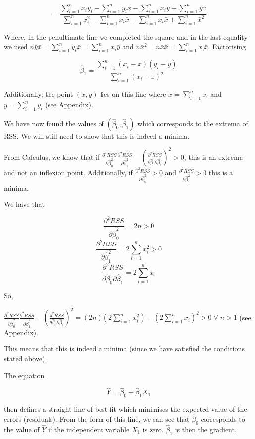 \documentclass[11pt]{article}
\begin{document}
\[= \frac{\sum_{i=1}^n x_i y_i - \sum_{i=1}^n y_i \bar{x} - \sum_{i=1}^n x_i \bar{y}  + \sum_{i=1}^n \bar{y} \bar{x}}{\sum_{i=1}^n x_i^2 - \sum_{i=1}^n x_i \bar{x} - \sum_{i=1}^n x_i \bar{x} + \sum_{i=1}^n \bar{x}^2}\]

Where, in the penultimate line we completed the square and in the last
equality we used
\(n\bar{y} \bar{x} = \sum_{i=1}^n y_i \bar{x} = \sum_{i=1}^n x_i \bar{y}\)
and \(n\bar{x}^2 = n\bar{x} \bar{x} = \sum_{i=1}^n x_i \bar{x}\).
Factorising

\[\hat{\beta}_1 = \frac{\sum_{i=1}^n (x_i - \bar{x})(y_i - \bar{y})}{\sum_{i=1}^n (x_i - \bar{x})^2}\]

Additionally, the point \((\bar{x},\bar{y})\) lies on this line where
\(\bar{x} = \sum_{i=1}^n x_i\) and \(\bar{y} = \sum_{i=1}^n y_i\) (see
Appendix).

We have now found the values of \((\hat{\beta}_0,\hat{\beta}_1)\) which
corresponds to the extrema of RSS. We will still need to show that this
is indeed a minima.

From Calculus, we know that if
\(\frac{\partial^2 RSS}{\partial \hat{\beta}_0 ^2} \frac{\partial^2 RSS}{\partial \hat{\beta}_1 ^2} - (\frac{\partial^2 RSS}{\partial \hat{\beta}_0 \partial \hat{\beta}_1})^2 > 0\),
this is an extrema and not an inflexion point. Additionally, if
\(\frac{\partial^2 RSS}{\partial \hat{\beta}_0 ^2} > 0\) and
\(\frac{\partial^2 RSS}{\partial \hat{\beta}_1 ^2} > 0\) this is a
minima.

We have that

\[\frac{\partial^2 RSS}{\partial \hat{\beta}_0 ^2} = 2n > 0\]
\[\frac{\partial^2 RSS}{\partial \hat{\beta}_1 ^2} = 2 \sum_{i=1}^n x_i^2 > 0\]
\[\frac{\partial^2 RSS}{\partial \hat{\beta}_0 \partial \hat{\beta}_1} = 2 \sum_{i=1}^n x_i\]

So,

\(\frac{\partial^2 RSS}{\partial \hat{\beta}_0 ^2} \frac{\partial^2 RSS}{\partial \hat{\beta}_1 ^2} - (\frac{\partial^2 RSS}{\partial \hat{\beta}_0 \partial \hat{\beta}_1})^2 = (2n) (2 \sum_{i=1}^n x_i^2) - (2 \sum_{i=1}^n x_i)^2 > 0 \; \forall \; n>1\)
(see Appendix).

This means that this is indeed a minima (since we have satisfied the
conditions stated above).

The equation

\[\hat{Y} = \hat{\beta}_0 + \hat{\beta}_1 X_1\]

then defines a straight line of best fit which minimises the expected
value of the errors (residuals). From the form of this line, we can see
that \(\hat{\beta}_0\) corresponds to the value of \(\hat{Y}\) if the
independent variable \(X_1\) is zero. \(\hat{\beta}_1\) is then the
gradient.
\end{document}
